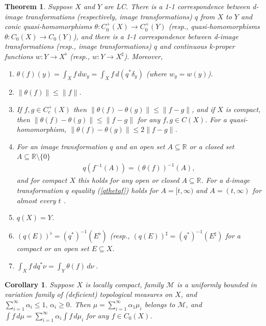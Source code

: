 \documentclass[10pt,a4paper]{amsart}
\newtheorem{theorem}{Theorem}
\newtheorem{corollary}{Corollary}
\begin{document}
\begin{theorem} \label{ITqh}
Suppose $X$ and $Y$  are LC. There is a 1-1 correspondence between d-image transformations (respectively, image transformations) 
$q$ from $X$ to $Y$ and 
conic quasi-homomorphisms $\theta : C_0^+(X) \longrightarrow C_0^+(Y)$ 
(resp., quasi-homomorphisms $\theta : C_0(X) \longrightarrow C_0(Y)$),
and there is a 1-1 correspondence between d-image transformations (resp., image transformations) 
$q$ and continuous k-proper functions $w: Y \longrightarrow X^{\flat}$ (resp.,   $w: Y \longrightarrow X^\sharp$).
Moreover,
\begin{enumerate}[leftmargin=0.25in, label=(h\arabic*),ref=(h\arabic*)]
\item \label{ITqh1}
$\theta(f)(y) = \int_X f\, dw_y =  \int_X f \, d(q^*\delta_y)$ (where $w_y = w(y)$).
\item \label{ITqh6}
$ \| \theta(f) \| \le \| f\|$. 
\item \label{ITqh6a}
If $ f, g \in C_c^+(X)$ then $ \| \theta(f) - \theta(g) \| \le \| f -g\|$, and if $X$ is compact, then 
$ \| \theta(f) - \theta(g) \| \le \| f -g\|$ for any $f,g \in C(X)$. 
For a quasi-homomorphism, $\| \theta(f) - \theta(g) \| \le 2 \| f -g\|$. 
\item \label{ITqh4}
For an image transformation $q$ and an open set $ A \subseteq \mathbb{R}$ or a closed set $A \subseteq \mathbb{R} \setminus \{ 0\}$ 
\begin{align} \label{qthetaf}
q(f^{-1}(A)) = (\theta(f))^{-1} (A),
\end{align}
and for compact $X$ this holds for any open or closed $ A \subseteq \mathbb{R}$. For a d-image transformation $q$ equality (\ref{qthetaf}) holds for
$A=[t, \infty)$ and $A=(t, \infty)$ for  almost every $t$ .
\item \label{ITqh12}
$q(X) = Y$.
\item \label{ITqh15}
$(q(E))^{\flat}  = (q^*)^{-1}(E^{\flat})$ (resp., $(q(E))^{\sharp}  = (q^*)^{-1}(E^{\sharp})$ for a compact or an open set $E \subseteq X$.
\item \label{ITqh5}
$ \int_X f \, dq^*\nu = \int_Y \theta(f) \, d\nu \  $.
\end{enumerate}
\end{theorem}

\begin{corollary} \label{inftSuDTM}
Suppose $X$ is locally compact, 
family $\mathcal{M}$ is a uniformly bounded in variation family of (deficient) topological measures on $X$, and 
$\sum_{i=1}^\infty \alpha_i \le 1, \, \alpha_i \ge 0$.
Then $\mu = \sum_{i=1}^\infty  \alpha_1 \mu_i$  belongs to $\mathcal{M}$,  and 
$ \int f \, d \mu = \sum_{i=1}^\infty  \alpha_i  \int f\, d \mu_i$ for any $ f \in C_0(X)$.  
\end{corollary}
\end{document}
